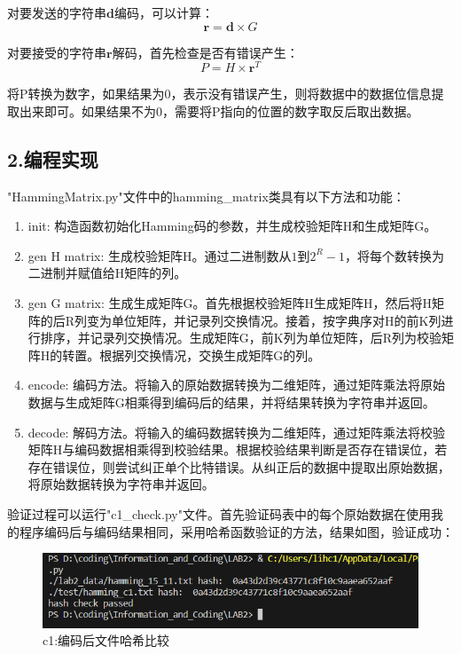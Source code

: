 \documentclass[12pt, a4paper]{ctexart}
\begin{document}
    对要发送的字符串$\bm{d}$编码，可以计算：
    $$
    \bm{r} = \bm{d} \times G  
    $$

    对要接受的字符串$\bm{r} $解码，首先检查是否有错误产生：
    $$
    P = H \times \bm{r}^T 
    $$
    
    将P转换为数字，如果结果为0，表示没有错误产生，则将数据中的数据位信息提取出来即可。如果结果不为0，需要将P指向的位置的数字取反后取出数据。

    \subsection*{2.编程实现}

    "HammingMatrix.py"文件中的hamming\_matrix类具有以下方法和功能：

    \begin{enumerate}
        \item init: 构造函数初始化Hamming码的参数，并生成校验矩阵H和生成矩阵G。
        \item gen H matrix: 生成校验矩阵H。通过二进制数从$1$到$2^R-1$，将每个数转换为二进制并赋值给H矩阵的列。
        \item gen G matrix: 生成生成矩阵G。首先根据校验矩阵H生成矩阵H，然后将H矩阵的后R列变为单位矩阵，并记录列交换情况。接着，按字典序对H的前K列进行排序，并记录列交换情况。生成矩阵G，前K列为单位矩阵，后R列为校验矩阵H的转置。根据列交换情况，交换生成矩阵G的列。
        \item encode: 编码方法。将输入的原始数据转换为二维矩阵，通过矩阵乘法将原始数据与生成矩阵G相乘得到编码后的结果，并将结果转换为字符串并返回。
        \item decode: 解码方法。将输入的编码数据转换为二维矩阵，通过矩阵乘法将校验矩阵H与编码数据相乘得到校验结果。根据校验结果判断是否存在错误位，若存在错误位，则尝试纠正单个比特错误。从纠正后的数据中提取出原始数据，将原始数据转换为字符串并返回。
    \end{enumerate}

    验证过程可以运行"c1\_check.py"文件。首先验证码表中的每个原始数据在使用我的程序编码后与编码结果相同，采用哈希函数验证的方法，结果如图，验证成功：
    \begin{figure}[H]
        \centering
        \includegraphics[width=12cm]{./pic/1-1.png}		
        \caption{c1:编码后文件哈希比较}
    \end{figure}
\end{document}
